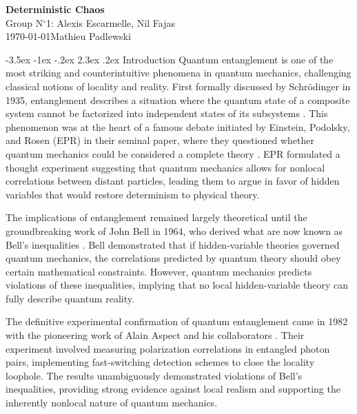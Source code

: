 \documentclass[a4paper, 12pt,oneside]{article}
\makeatletter
\renewcommand{\section}{\@startsection {section}{1}{\z@}%
             {-3.5ex \@plus -1ex \@minus -.2ex}%
             {2.3ex \@plus.2ex}%
             {\normalfont\normalsize\bfseries}}
\makeatother
\begin{document}
\begin{center}
\large\textbf{\sffamily Deterministic Chaos}\\%
\large\sffamily Group N$^\circ$1: Alexis Escarmelle, Nil Fajas\\%
\large\sffamily \today\qquad Mathieu Padlewski\\%
\end{center}

\section{Introduction}
Quantum entanglement is one of the most striking and counterintuitive phenomena in quantum mechanics, challenging classical notions of locality and reality. First formally discussed by Schrödinger in 1935, entanglement describes a situation where the quantum state of a composite system cannot be factorized into independent states of its subsystems \cite{Schrodinger}. This phenomenon was at the heart of a famous debate initiated by Einstein, Podolsky, and Rosen (EPR) in their seminal paper, where they questioned whether quantum mechanics could be considered a complete theory \cite{EPR}. EPR formulated a thought experiment suggesting that quantum mechanics allows for nonlocal correlations between distant particles, leading them to argue in favor of hidden variables that would restore determinism to physical theory.

The implications of entanglement remained largely theoretical until the groundbreaking work of John Bell in 1964, who derived what are now known as Bell's inequalities \cite{Bell}. Bell demonstrated that if hidden-variable theories governed quantum mechanics, the correlations predicted by quantum theory should obey certain mathematical constraints. However, quantum mechanics predicts violations of these inequalities, implying that no local hidden-variable theory can fully describe quantum reality.

The definitive experimental confirmation of quantum entanglement came in 1982 with the pioneering work of Alain Aspect and his collaborators \cite{Alain Aspect}. Their experiment involved measuring polarization correlations in entangled photon pairs, implementing fast-switching detection schemes to close the locality loophole. The results unambiguously demonstrated violations of Bell’s inequalities, providing strong evidence against local realism and supporting the inherently nonlocal nature of quantum mechanics.
\end{document}
